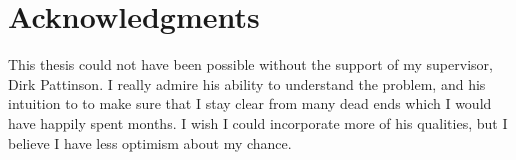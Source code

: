 \chapter*{Acknowledgments}
This thesis could not have been possible without the support of my supervisor, Dirk Pattinson. I really admire his 
ability to understand the problem, and his intuition to to make sure that I stay clear from many dead ends which 
I would have happily spent months. I wish
I could incorporate more of his qualities, but I believe I have less optimism about my chance.
